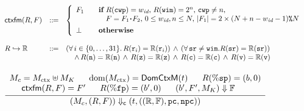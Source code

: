 \begin{figure}[!t]
    \centering
    \[
        \begin{array}{lcl}
            \textsf{ctxfm}(R, F) & ::\!\!{=} & 
            \left\{
            \begin{array}{ll}
                F_1 & \quad \textbf{if} \
                R(\texttt{cwp}) = w_{\textit{id}}, \, 
                R(\texttt{wim}) = 2^{n}, \, 
                \texttt{cwp} \neq n, \\
                & \qquad
                F = F_1 \!\bm{\cdot}\! F_2, \, 
                0 \leq w_{\textit{id}}, n \leq N, \, 
                | F_1 | = 2 \times 
                    {(N + n - w_{\textit{id}}- 1)}\texttt{\%}{N} \\
                \\[-8pt]
                \perp & \quad \textbf{otherwise}
            \end{array} 
            \right. \\
            \\
            {R}\hookrightarrow{\mathbb{R}} & ::\!\!{=} & 
            (\forall \, i \in \{ 0, \dots, 31 \}. \, 
                R(\texttt{r}_{i}) = \mathbb{R}(\texttt{r}_{i}))
                \, \land \, 
                (\forall \, \texttt{sr} \neq \texttt{wim}.   
                R(\texttt{sr}) = \mathbb{R}(\texttt{sr})) \\
            & & \quad \, \land \, 
            R(\texttt{n}) = \mathbb{R}(\texttt{n}) \, \land \, 
            R(\texttt{z}) = \mathbb{R}(\texttt{z}) \, \land \, 
            R(\texttt{c}) = \mathbb{R}(\texttt{c}) \, \land \, 
            R(\texttt{v}) = \mathbb{R}(\texttt{v}) \\
        \end{array}
    \]
    \[
        \begin{array}{c}
            \\[-5pt]
            \infer
            {
                \curStRel{(\Mem_c, (\RFile, \Wstack))}
                    {(\thrdid, ((\hRfile, \hWstk), \pc, \npc))}
            }
            {
                \begin{array}{c}
                    \Mem_c = \Mem_{\text{ctx}} \uplus \Mem_K 
                    \quad \ \ 
                    \dom(\Mem_{\text{ctx}}) = \DomCtx{(\thrdid)}
                    \quad \ \ 
                    \RFile(\spreg) = (\block, 0) 
                    \\
                    \ctxfm(\RFile, \Wstack) = \Wstack' \quad \ \ 
                    \RFile(\fpreg) = (\block', 0) \quad \ \ 
                    \stkRel{(\block', \Wstack', \Mem_K)}{\hWstk} 
                    \quad \ \ 

\end{array}}
\end{array}\]
\end{figure}
